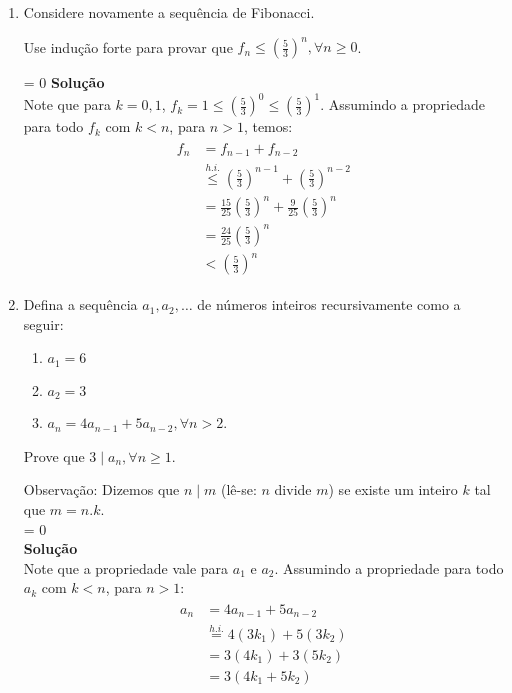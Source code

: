 \documentclass[a4paper]{article}
\newcommand{\answer}[2]{\ifnum#1= 0  {\color{blue} #2}\else \fi}
\begin{document}
\begin{enumerate}
\item Considere novamente a
  sequ\^encia de Fibonacci. 
  
  Use indução forte para provar que $f_n \leq (\frac{5}{3})^n,
  \forall n\geq 0$.
  
  \answer{0}{ 
    {\bf Solução} \\
    Note que para $k=0,1$, $f_k=1\leq
    (\frac{5}{3})^0\leq  (\frac{5}{3})^1$. 
    Assumindo a propriedade para todo $f_k$ com  $k < n$,
    para $n>1$, temos:
    \begin{align*}
      \begin{split}
        f_n &= f_{n-1} + f_{n-2}\\
        &\stackrel{h.i.}{\le} \left(\frac{5}{3}\right)^{n-1} + \left(\frac{5}{3}\right)^{n-2}\\
        &= \frac{15}{25}   \left(\frac{5}{3}\right)^n + \frac{9}{25}   \left(\frac{5}{3}\right)^n\\
        &= \frac{24}{25}   \left(\frac{5}{3}\right)^n\\
        &< \left(\frac{5}{3}\right)^n
      \end{split}
    \end{align*}
  }

\item Defina a sequência $a_1, a_2, \ldots$ de números inteiros
  recursivamente como a seguir:
  \begin{enumerate}
  \item $a_1=6$
  \item $a_2=3$
  \item $a_n = 4 a_{n-1} + 5 a_{n-2}, \forall n>2$.
  \end{enumerate}
  
  Prove que $3 \mid a_n, \forall n\geq 1$.
  
  Observação: Dizemos que $n \mid m$ (lê-se: $n$ divide $m$) se existe um inteiro $k$ tal
  que $m = n.k$.\\
  \answer{0}{\\ 
    {\bf Solução} \\  Note que a propriedade
    vale para $a_1$ e $a_2$. 
    Assumindo a propriedade para todo
    $a_k$ com $k<n$, para $n>1$:
    \begin{align*}
      \begin{split}
        a_n &= 4 a_{n-1} + 5 a_{n-2}\\
        &\stackrel{h.i.}{=} 4(3 k_1) + 5(3 k_2)\\
        &=3(4 k_1) + 3(5 k_2)\\
        &=3 (4 k_1 + 5 k_2) 
      \end{split}
    \end{align*}	
  }
  

\end{enumerate}
\end{document}
